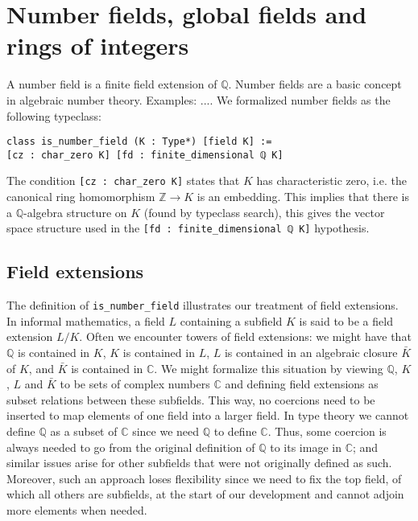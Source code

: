 \documentclass[a4paper,USenglish,cleveref, autoref, thm-restate]{lipics-v2021}
\newcommand{\C}{\mathbb{C}}
\newcommand{\lean}[1]{\texttt{#1}\xspace} %
\newcommand{\Q}{\mathbb{Q}}
\newcommand{\Z}{\mathbb{Z}}
\begin{document}



\section{Number fields, global fields and rings of integers}

A number field is a finite field extension of $\Q$.
Number fields are a basic concept in algebraic number theory. Examples: ....
We formalized number fields as the following typeclass:
\begin{lstlisting}
class is_number_field (K : Type*) [field K] :=
[cz : char_zero K] [fd : finite_dimensional ℚ K]
\end{lstlisting}
The condition \lean{[cz : char\_zero K]} states that $K$ has characteristic zero, i.e. the canonical ring homomorphism $\Z \to K$ is an embedding.
This implies that there is a $\Q$-algebra structure on $K$ (found by typeclass search), this gives the vector space structure used in the \lean{[fd : finite\_dimensional ℚ K]} hypothesis.

\subsection{Field extensions}

The definition of \lean{is\_number\_field} illustrates our treatment of field extensions.
In informal mathematics, a field $L$ containing a subfield $K$ is said to be a field extension $L / K$.
Often we encounter towers of field extensions: we might have that $\Q$ is contained in $K$, $K$ is contained in $L$, $L$ is contained in an algebraic closure $\bar{K}$ of $K$, and $\bar{K}$ is contained in $\C$.
We might formalize this situation by viewing $\Q$, $K$, $L$ and $\bar{K}$ to be sets of complex numbers $\C$ and defining field extensions as subset relations between these subfields.
This way, no coercions need to be inserted to map elements of one field into a larger field.
In type theory we cannot define $\Q$ as a subset of $\C$ since we need $\Q$ to define $\C$.
Thus, some coercion is always needed to go from the original definition of $\Q$ to its image in $\C$; and similar issues arise for other subfields that were not originally defined as such.
Moreover, such an approach loses flexibility since we need to fix the top field, of which all others are subfields, at the start of our development and cannot adjoin more elements when needed.
\end{document}
